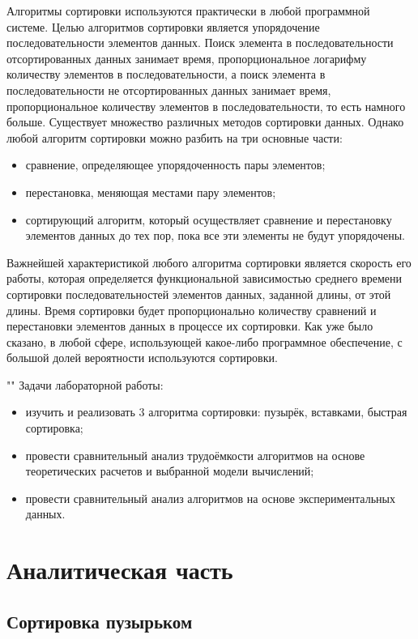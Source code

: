 \documentclass[12pt]{report}
\begin{document}
Алгоритмы сортировки используются практически в любой программной системе. Целью алгоритмов сортировки является упорядочение последовательности элементов данных. Поиск элемента в последовательности отсортированных данных занимает время, пропорциональное логарифму количеству элементов в последовательности, а поиск элемента в последовательности не отсортированных данных занимает время, пропорциональное количеству элементов в последовательности, то есть намного больше. Существует множество различных методов сортировки данных. Однако любой алгоритм сортировки можно разбить на три основные части:

\begin{itemize}
	\item сравнение, определяющее упорядоченность пары элементов;
	\item перестановка, меняющая местами пару элементов;
	\item сортирующий алгоритм, который осуществляет сравнение и перестановку элементов данных до тех пор, пока все эти элементы не будут упорядочены.
\end{itemize}

Важнейшей характеристикой любого алгоритма сортировки является скорость его работы, которая определяется функциональной зависимостью среднего времени сортировки последовательностей элементов данных, заданной длины, от этой длины. Время сортировки будет пропорционально количеству сравнений и перестановки элементов данных в процессе их сортировки. Как уже было сказано, в любой сфере, использующей какое-либо программное обеспечение, с большой долей вероятности используются сортировки.  

""\newline
Задачи лабораторной работы:
\begin{itemize}
	\item изучить и реализовать 3 алгоритма сортировки: пузырёк, вставками, быстрая сортировка;
	\item провести сравнительный анализ трудоёмкости алгоритмов на основе теоретических расчетов и выбранной модели вычислений;
	\item провести сравнительный анализ алгоритмов на основе экспериментальных данных.
\end{itemize}

\chapter{Аналитическая часть}

\section{Сортировка пузырьком}
\end{document}
